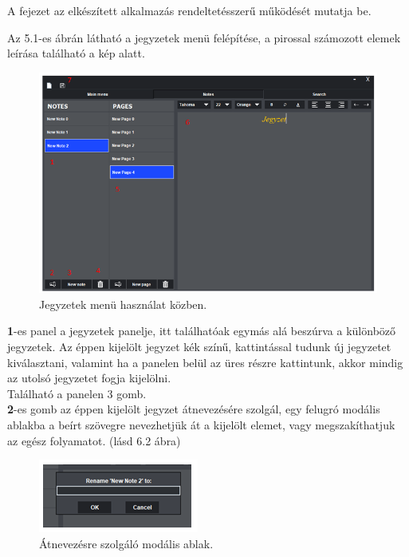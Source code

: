 
A fejezet az elkészített alkalmazás rendeltetésszerű működését mutatja be.


Az 5.1-es ábrán látható a jegyzetek menü felépítése, a pirossal számozott elemek leírása található a kép alatt.

\begin{figure}[h]
	\centering
	\includegraphics[scale=0.5]{images/doc_1.png}
	\caption{Jegyzetek menü használat közben.}
	\label{fig:menu_notes_2}
\end{figure}

\vspace{5pt} \noindent \textbf{1}-es panel a jegyzetek panelje, itt találhatóak egymás alá beszúrva a különböző jegyzetek. Az éppen kijelölt jegyzet kék színű, kattintással tudunk új jegyzetet kiválasztani, valamint ha a panelen belül az üres részre kattintunk, akkor mindig az utolsó jegyzetet fogja kijelölni.
\newline \\ Található a panelen 3 gomb. 
\vspace{5pt} \\ \textbf{2}-es gomb az éppen kijelölt jegyzet átnevezésére szolgál, egy felugró modális ablakba a beírt szövegre nevezhetjük át a kijelölt elemet, vagy megszakíthatjuk az egész folyamatot. (lásd 6.2 ábra)

\begin{figure}[h]
	\centering
	\includegraphics[scale=0.6]{images/doc_2.png}
	\caption{Átnevezésre szolgáló modális ablak.}
	\label{fig:menu_notes_rename}
\end{figure}

